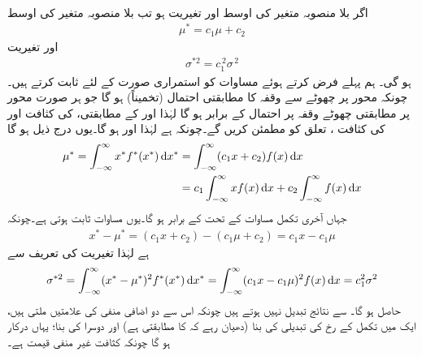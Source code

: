 \quad {}\\
اگر بلا منصوبہ متغیر  کی اوسط  اور تغیریت  ہو تب بلا منصوبہ متغیر  کی اوسط
\begin{align}\label{مساوات_شماریات_اوسط_تغیریت_ٹ}
\mu^*=c_1\mu+c_2
\end{align}
 اور تغیریت
\begin{align}\label{مساوات_شماریات_اوسط_تغیریت_ث}
\sigma^{*2}=c_1^{\,2}\sigma^{\,2}
\end{align}
ہو گی۔
\quad
ہم پہلے  فرض کرتے ہوئے مساوات  کو استمراری صورت کے لئے ثابت کرتے ہیں۔چونکہ  محور پر چھوٹے سے وقفہ  کا مطابقتی احتمال (تخمیناً)  ہو گا جو ہر صورت  محور پر مطابقتی چھوٹے وقفہ  پر احتمال  کے برابر ہو گا لہٰذا  اور  کے مطابقتی،  کی کثافت  اور  کی کثافت ،  تعلق  کو مطمئن کریں گے۔چونکہ  ہے لہٰذا  اور  ہو گا۔یوں درج ذیل ہو گا
\begin{align*}
\mu^*=\int_{-\infty}^{\infty} x^*f^*(x^*)\dif x^*&=\int_{-\infty}^{\infty} (c_1x+c_2)f(x)\dif x\\
&=c_1\int_{-\infty}^{\infty}xf(x)\dif x+c_2\int_{-\infty}^{\infty}f(x)\dif x
\end{align*}
جہاں آخری تکمل مساوات  کے تحت  کے برابر ہو گا۔یوں  مساوات  ثابت ہوتی ہے۔چونکہ
\begin{align*}
x^*-\mu^*=(c_1x+c_2)-(c_1\mu+c_2)=c_1x-c_1\mu
\end{align*}
ہے لہٰذا تغیریت کی تعریف سے
\begin{align*}
\sigma^{*2}=\int_{-\infty}^{\infty} (x^*-\mu^*)^2f^*(x^*)\dif x^*=\int_{-\infty}^{\infty} (c_1x-c_1\mu)^2f(x)\dif x=c_1^2\sigma^2
\end{align*}
حاصل ہو گا۔  سے نتائج تبدیل نہیں ہوتے ہیں چونکہ اس سے دو اضافی منفی کی علامتیں ملتی ہیں، ایک  میں تکمل کے رخ کی تبدیلی کی بنا (دھیان رہے کہ  کا مطابقتی  ہے) اور دوسرا  کی بنا؛ یہاں  درکار ہو گا چونکہ کثافت غیر منفی قیمت ہے۔  


